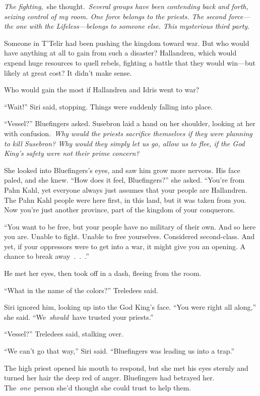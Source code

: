 \textit{The fighting,}~she thought.~\textit{Several groups have been contending back and forth, seizing control of my room. One force belongs to the priests. The second force—the one with the Lifeless—belongs to someone else. This mysterious third party.}

Someone in T’Telir had been pushing the kingdom toward war. But who would have anything at all to gain from such a disaster? Hallandren, which would expend huge resources to quell rebels, fighting a battle that they would win—but likely at great cost? It didn’t make sense.

Who would gain the most if Hallandren and Idris went to war?

“Wait!” Siri said, stopping. Things were suddenly falling into place.

“Vessel?” Bluefingers asked. Susebron laid a hand on her shoulder, looking at her with confusion.~\textit{Why would the priests sacrifice themselves if they were planning to kill Susebron? Why would they simply let us go, allow us to flee, if the God King’s safety were not their prime concern?}

She looked into Bluefingers’s eyes, and saw him grow more nervous. His face paled, and she knew. “How does it feel, Bluefingers?” she asked. “You’re from Pahn Kahl, yet everyone always just assumes that your people are Hallandren. The Pahn Kahl people were here first, in this land, but it was taken from you. Now you’re just another province, part of the kingdom of your conquerors.

“You want to be free, but your people have no military of their own. And so here you are. Unable to fight. Unable to free yourselves. Considered second-class. And yet, if your oppressors were to get into a war, it might give you an opening. A chance to break away~.~.~.”

He met her eyes, then took off in a dash, fleeing from the room.

“What in the name of the colors?” Treledees said.

Siri ignored him, looking up into the God King’s face. “You were right all along,” she said. “We~\textit{should}~have trusted your priests.”

“Vessel?” Treledees said, stalking over.

“We can’t go that way,” Siri said. “Bluefingers was leading us into a trap.”

The high priest opened his mouth to respond, but she met his eyes sternly and turned her hair the deep red of anger. Bluefingers had betrayed her. The~\textit{one}~person she’d thought she could trust to help them.

